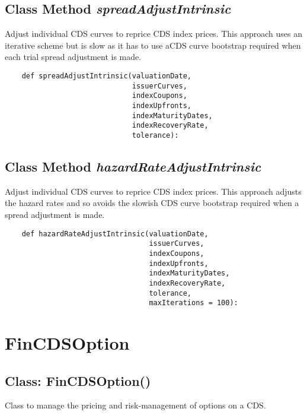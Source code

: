 \documentclass[twoside,11pt]{book}
\begin{document}
\subsection{Class Method {\it spreadAdjustIntrinsic}}
Adjust individual CDS curves to reprice CDS index prices. This approach uses an iterative scheme but is slow as it has to use aCDS curve bootstrap required when each trial spread adjustment is made.

\begin{lstlisting}
    def spreadAdjustIntrinsic(valuationDate,
                              issuerCurves,
                              indexCoupons,
                              indexUpfronts,
                              indexMaturityDates,
                              indexRecoveryRate,
                              tolerance):
\end{lstlisting}

\subsection{Class Method {\it hazardRateAdjustIntrinsic}}
Adjust individual CDS curves to reprice CDS index prices. This approach adjusts the hazard rates and so avoids the slowish CDS curve bootstrap required when a spread adjustment is made.

\begin{lstlisting}
    def hazardRateAdjustIntrinsic(valuationDate, 
                                  issuerCurves,
                                  indexCoupons,
                                  indexUpfronts,
                                  indexMaturityDates,
                                  indexRecoveryRate,
                                  tolerance,
                                  maxIterations = 100):
\end{lstlisting}

\newpage
\section{FinCDSOption}

\subsection{Class: FinCDSOption()}
Class to manage the pricing and risk-management of options on a CDS. 
\end{document}
